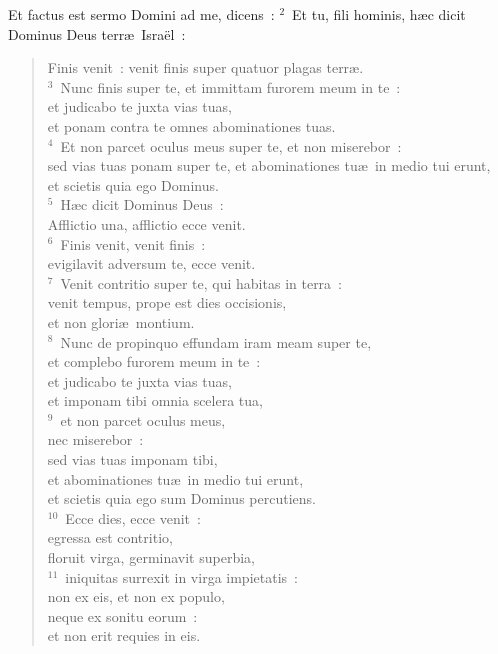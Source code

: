 \lettrine[lines=10,image=true,loversize=0.05,lraise=-0.03]{E}{}t factus est sermo Domini ad me, dicens~:
${}^{2}$~Et tu, fili hominis, h\ae c dicit Dominus Deus terr\ae\ Isra\"el~: \begin{flushleft}\begin{verse}Finis venit~: venit finis super quatuor plagas terr\ae .\\
${}^{3}$~Nunc finis super te, et immittam furorem meum in te~:\\ et judicabo te juxta vias tuas,\\ et ponam contra te omnes abominationes tuas.\\
${}^{4}$~Et non parcet oculus meus super te, et non miserebor~:\\ sed vias tuas ponam super te, et abominationes tu\ae\ in medio tui erunt,\\ et scietis quia ego Dominus.\\
${}^{5}$~H\ae c dicit Dominus Deus~:\\ Afflictio una, afflictio ecce venit.\\
${}^{6}$~Finis venit, venit finis~:\\ evigilavit adversum te, ecce venit.\\
${}^{7}$~Venit contritio super te, qui habitas in terra~:\\ venit tempus, prope est dies occisionis,\\ et non glori\ae\ montium.\\
${}^{8}$~Nunc de propinquo effundam iram meam super te,\\ et complebo furorem meum in te~:\\ et judicabo te juxta vias tuas,\\ et imponam tibi omnia scelera tua,\\
${}^{9}$~et non parcet oculus meus,\\ nec miserebor~:\\ sed vias tuas imponam tibi,\\ et abominationes tu\ae\ in medio tui erunt,\\ et scietis quia ego sum Dominus percutiens.\\
${}^{10}$~Ecce dies, ecce venit~:\\ egressa est contritio,\\ floruit virga, germinavit superbia,\\
${}^{11}$~iniquitas surrexit in virga impietatis~:\\ non ex eis, et non ex populo,\\ neque ex sonitu eorum~:\\ et non erit requies in eis.\\

\end{verse}
\end{flushleft}
